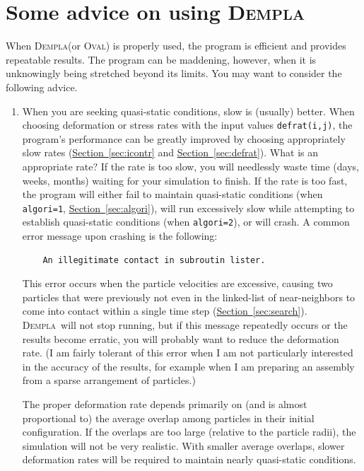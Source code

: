 \documentclass[letterpaper,11pt]{article}
\newcommand{\Oval}{\textsc{Oval}}
\newcommand{\Dempla}{\textsc{Dempla}}
\begin{document}
\section{Some advice on using \Dempla}\label{sec:advice}
When \Dempla (or \Oval) is properly used,
the program is efficient and provides
repeatable results.
The program can be maddening, however, when it is unknowingly being stretched
beyond its limits.
You may want to consider the following advice.
\begin{enumerate}
\item\label{item:slowisbetter}
When you are seeking quasi-static conditions,
slow is (usually) better.
When choosing deformation or stress rates with the
input values \texttt{defrat(i,j)}, the program's performance
can be greatly improved by choosing appropriately slow rates
(\hyperref[sec:icontr]{Section~\ref*{sec:icontr}}
and \hyperref[sec:defrat]{Section~\ref*{sec:defrat}}).
What is an appropriate rate?
If the rate is too slow, you will needlessly waste time (days, weeks,
months) waiting for your simulation to finish.
If the rate is too fast, the program will either fail to maintain
quasi-static conditions (when \texttt{algori=1}, 
\hyperref[sec:algori]{Section~\ref*{sec:algori}}), will run
excessively slow while attempting to establish quasi-static conditions
(when \texttt{algori=2}), or will crash.
A common error message upon crashing is the following:
\begin{verbatim}
    An illegitimate contact in subroutin lister.
\end{verbatim}
This error occurs when the particle velocities are excessive, causing 
two particles that were previously not even in the linked-list
of near-neighbors to come into contact within a single time step
(\hyperref[sec:search]{Section~\ref*{sec:search}}).
\Dempla\ will not stop running, but if this message repeatedly occurs or
the results become erratic, you will probably want to reduce the deformation
rate.
(I am fairly tolerant of this error when I am not particularly interested
in the accuracy of the results, for example when I am preparing an assembly
from a sparse arrangement of particles.)
\par
The proper deformation rate depends primarily on (and is 
almost proportional to)
the average overlap among particles in their initial configuration.
If the overlaps are too large (relative to the particle radii), 
the simulation will not be very realistic.
With smaller average overlaps, slower deformation rates will be required
to maintain nearly quasi-static conditions.

\end{enumerate}
\end{document}
